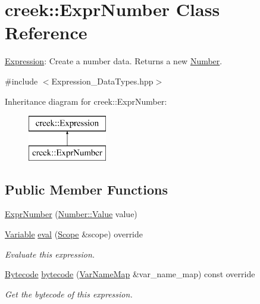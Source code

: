 \hypertarget{classcreek_1_1_expr_number}{}\section{creek\+:\+:Expr\+Number Class Reference}
\label{classcreek_1_1_expr_number}


\hyperlink{classcreek_1_1_expression}{Expression}\+: Create a number data. Returns a new {\ttfamily \hyperlink{classcreek_1_1_number}{Number}}.  




{\ttfamily \#include $<$Expression\+\_\+\+Data\+Types.\+hpp$>$}

Inheritance diagram for creek\+:\+:Expr\+Number\+:\begin{figure}[H]
\begin{center}
\leavevmode
\includegraphics[height=2.000000cm]{classcreek_1_1_expr_number}
\end{center}
\end{figure}
\subsection*{Public Member Functions}
\begin{DoxyCompactItemize}
\item 
\hyperlink{classcreek_1_1_expr_number_a3201e8bd28ffdf43496798c7dbed049e}{Expr\+Number} (\hyperlink{classcreek_1_1_number_ac7b75fc8a57a0a16fa2417b57a538a18}{Number\+::\+Value} value)
\item 
\hyperlink{classcreek_1_1_variable}{Variable} \hyperlink{classcreek_1_1_expr_number_af9733eb2e8a6f30cdfe3fcf3029725e4}{eval} (\hyperlink{classcreek_1_1_scope}{Scope} \&scope) override
\begin{DoxyCompactList}\small\item\em Evaluate this expression. \end{DoxyCompactList}\item 
\hyperlink{classcreek_1_1_bytecode}{Bytecode} \hyperlink{classcreek_1_1_expr_number_a75575e04f98c25c6e52b84cd068a3305}{bytecode} (\hyperlink{classcreek_1_1_var_name_map}{Var\+Name\+Map} \&var\+\_\+name\+\_\+map) const  override\hypertarget{classcreek_1_1_expr_number_a75575e04f98c25c6e52b84cd068a3305}{}\label{classcreek_1_1_expr_number_a75575e04f98c25c6e52b84cd068a3305}

\begin{DoxyCompactList}\small\item\em Get the bytecode of this expression. \end{DoxyCompactList}\end{DoxyCompactItemize}


